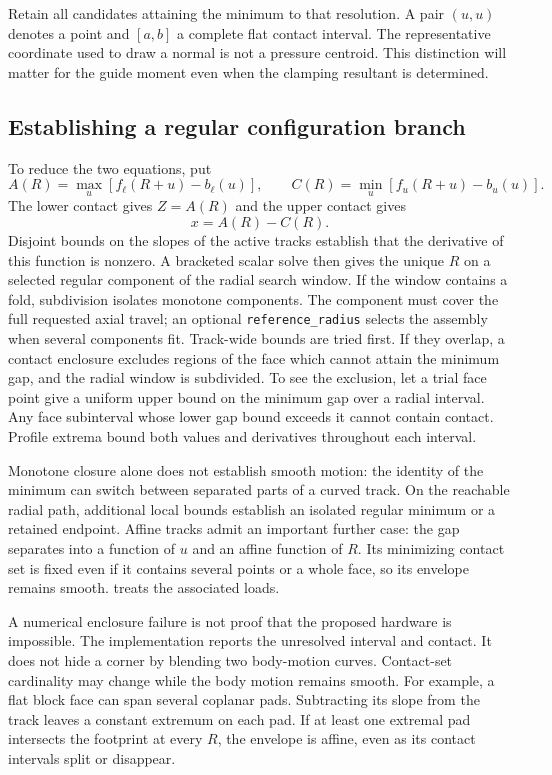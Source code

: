 \documentclass[11pt,letterpaper]{article}
\numberwithin{equation}{section}
\begin{document}
Retain all candidates attaining the minimum to that resolution. A pair
$(u,u)$ denotes a point and $[a,b]$ a complete flat contact interval. The
representative coordinate used to draw a normal is not a pressure centroid.
This distinction will matter for the guide moment even when the clamping
resultant is determined.

\subsection{Establishing a regular configuration branch}

To reduce the two equations, put
\begin{equation}
 A(R)=\max_u[f_\ell(R+u)-b_\ell(u)],\qquad
 C(R)=\min_u[f_u(R+u)-b_u(u)].
\end{equation}
The lower contact gives $Z=A(R)$ and the upper contact gives
\begin{equation}
 x=A(R)-C(R).
 \label{eq:inverse}
\end{equation}
Disjoint bounds on the slopes of the active tracks establish that the
derivative of this function is nonzero. A bracketed scalar solve then gives
the unique $R$ on a selected regular component of the radial search window.
If the window contains a fold, subdivision isolates monotone components.
The component must cover the full requested axial travel; an optional
\texttt{reference\_radius} selects the assembly when several components fit. Track-wide bounds are tried
first. If they overlap, a contact enclosure excludes regions of the face
which cannot attain the minimum gap, and the radial window is subdivided.
To see the exclusion, let a trial face point give a uniform upper bound on
the minimum gap over a radial interval. Any face subinterval whose lower gap
bound exceeds it cannot contain contact. Profile extrema bound both values
and derivatives throughout each interval.

Monotone closure alone does not establish smooth motion: the identity of the
minimum can switch between separated parts of a curved track. On the reachable
radial path, additional local bounds establish an isolated regular minimum or
a retained endpoint. Affine tracks admit an important further case: the gap
separates into a function of $u$ and an affine function of $R$. Its minimizing
contact set is fixed even if it contains several points or a whole face, so
its envelope remains smooth.  treats the associated loads.

A numerical enclosure failure is not proof that the proposed hardware is
impossible. The implementation reports the unresolved interval and contact.
It does not hide a corner by blending two body-motion curves. Contact-set
cardinality may change while the body motion remains smooth. For example,
a flat block face can span several coplanar pads. Subtracting its slope from
the track leaves a constant extremum on each pad. If at least one extremal
pad intersects the footprint at every $R$, the envelope is affine, even as
its contact intervals split or disappear.
\end{document}
